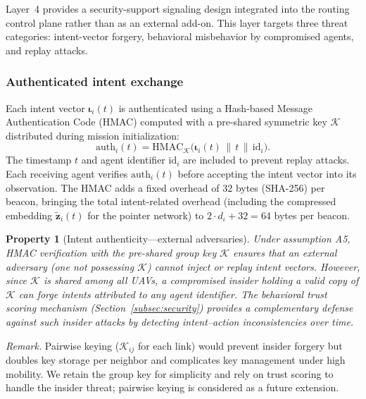 \documentclass[5p,times]{elsarticle}
\newtheorem{property}{Property}[section]
\begin{document}
Layer~4 provides a security-support signaling design integrated into the routing control plane rather than as an external add-on. This layer targets three threat categories: intent-vector forgery, behavioral misbehavior by compromised agents, and replay attacks.

\subsubsection{Authenticated intent exchange}

Each intent vector $\boldsymbol{\iota}_i(t)$ is authenticated using a Hash-based Message Authentication Code (HMAC) computed with a pre-shared symmetric key $\mathcal{K}$ distributed during mission initialization:
\begin{equation}
\label{eq:hmac}
\mathrm{auth}_i(t) = \mathrm{HMAC}_{\mathcal{K}}\big(\boldsymbol{\iota}_i(t) \,\|\, t \,\|\, \mathrm{id}_i\big).
\end{equation}
The timestamp $t$ and agent identifier $\mathrm{id}_i$ are included to prevent replay attacks. Each receiving agent verifies $\mathrm{auth}_i(t)$ before accepting the intent vector into its observation. The HMAC adds a fixed overhead of 32 bytes (SHA-256) per beacon, bringing the total intent-related overhead (including the compressed embedding $\tilde{\mathbf{z}}_i(t)$ for the pointer network) to $2 \cdot d_\iota + 32 = 64$ bytes per beacon.

\begin{property}[Intent authenticity---external adversaries]
\label{prop:intent_auth}
Under assumption A5, HMAC verification with the pre-shared group key $\mathcal{K}$ ensures that an \emph{external} adversary (one not possessing $\mathcal{K}$) cannot inject or replay intent vectors. However, since $\mathcal{K}$ is shared among all UAVs, a \emph{compromised insider} holding a valid copy of $\mathcal{K}$ can forge intents attributed to any agent identifier. The behavioral trust scoring mechanism (Section~\ref{subsec:security}) provides a complementary defense against such insider attacks by detecting intent--action inconsistencies over time.
\end{property}

\noindent\textit{Remark.} Pairwise keying ($\mathcal{K}_{ij}$ for each link) would prevent insider forgery but doubles key storage per neighbor and complicates key management under high mobility. We retain the group key for simplicity and rely on trust scoring to handle the insider threat; pairwise keying is considered as a future extension.
\end{document}
